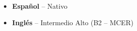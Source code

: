 \begin{itemize}[leftmargin=*]
  \item \textbf{Español} – Nativo
  \item \textbf{Inglés} – Intermedio Alto (B2 – MCER)
\end{itemize}
